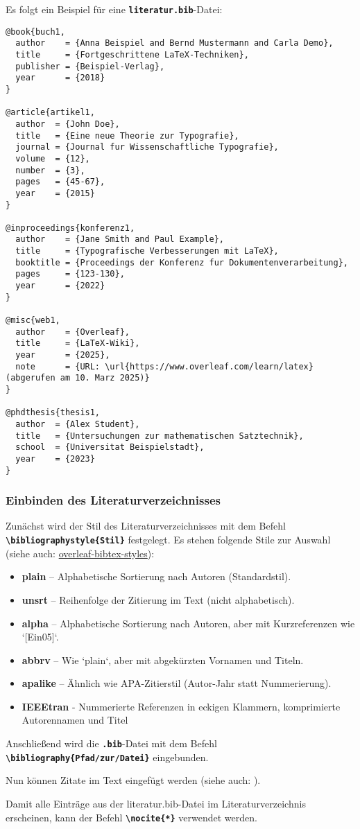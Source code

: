 Es folgt ein Beispiel für eine \textbf{\texttt{literatur.bib}}-Datei:

\begin{lstlisting}[language={[LaTeX]TeX}]
@book{buch1,
  author    = {Anna Beispiel and Bernd Mustermann and Carla Demo},
  title     = {Fortgeschrittene LaTeX-Techniken},
  publisher = {Beispiel-Verlag},
  year      = {2018}
}

@article{artikel1,
  author  = {John Doe},
  title   = {Eine neue Theorie zur Typografie},
  journal = {Journal fur Wissenschaftliche Typografie},
  volume  = {12},
  number  = {3},
  pages   = {45-67},
  year    = {2015}
}

@inproceedings{konferenz1,
  author    = {Jane Smith and Paul Example},
  title     = {Typografische Verbesserungen mit LaTeX},
  booktitle = {Proceedings der Konferenz fur Dokumentenverarbeitung},
  pages     = {123-130},
  year      = {2022}
}

@misc{web1,
  author    = {Overleaf},
  title     = {LaTeX-Wiki},
  year      = {2025},
  note      = {URL: \url{https://www.overleaf.com/learn/latex} (abgerufen am 10. Marz 2025)}
}

@phdthesis{thesis1,
  author  = {Alex Student},
  title   = {Untersuchungen zur mathematischen Satztechnik},
  school  = {Universitat Beispielstadt},
  year    = {2023}
}
\end{lstlisting}

\subsubsection{Einbinden des Literaturverzeichnisses}
Zunächst wird der Stil des Literaturverzeichnisses mit dem Befehl \textbf{\texttt{\textbackslash bibliographystyle\{Stil\}}} festgelegt.
Es stehen folgende Stile zur Auswahl (siehe auch: \href{https://www.overleaf.com/learn/latex/Bibtex_bibliography_styles}{overleaf-bibtex-styles}):
\begin{itemize}
  \item \textbf{plain} – Alphabetische Sortierung nach Autoren (Standardstil).
  \item \textbf{unsrt} – Reihenfolge der Zitierung im Text (nicht alphabetisch).
  \item \textbf{alpha} – Alphabetische Sortierung nach Autoren, aber mit Kurzreferenzen wie `[Ein05]`.
  \item \textbf{abbrv} – Wie `plain`, aber mit abgekürzten Vornamen und Titeln.
  \item \textbf{apalike} – Ähnlich wie APA-Zitierstil (Autor-Jahr statt Nummerierung).
  \item \textbf{IEEEtran} - Nummerierte Referenzen in eckigen Klammern, komprimierte Autorennamen und Titel
\end{itemize}

Anschließend wird die \textbf{\texttt{.bib}}-Datei mit dem Befehl \textbf{\texttt{\textbackslash bibliography\{Pfad/zur/Datei\}}} eingebunden.

Nun können Zitate im Text eingefügt werden (siehe auch: ).

Damit alle Einträge aus der literatur.bib-Datei im Literaturverzeichnis erscheinen, kann der Befehl \textbf{\texttt{\textbackslash nocite\{*\}}} verwendet werden.
